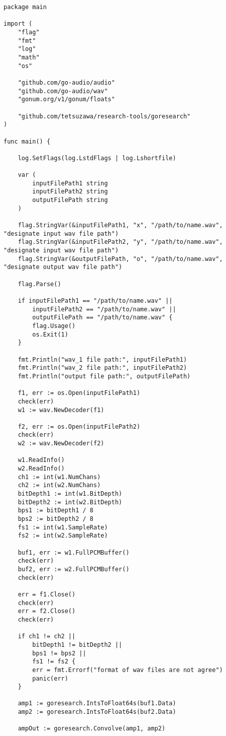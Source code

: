 \begin{lstlisting}[caption=cmd/convolve\_wav/main.go,label=convolve_wav]
package main

import (
	"flag"
	"fmt"
	"log"
	"math"
	"os"

	"github.com/go-audio/audio"
	"github.com/go-audio/wav"
	"gonum.org/v1/gonum/floats"

	"github.com/tetsuzawa/research-tools/goresearch"
)

func main() {

	log.SetFlags(log.LstdFlags | log.Lshortfile)

	var (
		inputFilePath1 string
		inputFilePath2 string
		outputFilePath string
	)

	flag.StringVar(&inputFilePath1, "x", "/path/to/name.wav", "designate input wav file path")
	flag.StringVar(&inputFilePath2, "y", "/path/to/name.wav", "designate input wav file path")
	flag.StringVar(&outputFilePath, "o", "/path/to/name.wav", "designate output wav file path")

	flag.Parse()

	if inputFilePath1 == "/path/to/name.wav" ||
		inputFilePath2 == "/path/to/name.wav" ||
		outputFilePath == "/path/to/name.wav" {
		flag.Usage()
		os.Exit(1)
	}

	fmt.Println("wav_1 file path:", inputFilePath1)
	fmt.Println("wav_2 file path:", inputFilePath2)
	fmt.Println("output file path:", outputFilePath)

	f1, err := os.Open(inputFilePath1)
	check(err)
	w1 := wav.NewDecoder(f1)

	f2, err := os.Open(inputFilePath2)
	check(err)
	w2 := wav.NewDecoder(f2)

	w1.ReadInfo()
	w2.ReadInfo()
	ch1 := int(w1.NumChans)
	ch2 := int(w2.NumChans)
	bitDepth1 := int(w1.BitDepth)
	bitDepth2 := int(w2.BitDepth)
	bps1 := bitDepth1 / 8
	bps2 := bitDepth2 / 8
	fs1 := int(w1.SampleRate)
	fs2 := int(w2.SampleRate)

	buf1, err := w1.FullPCMBuffer()
	check(err)
	buf2, err := w2.FullPCMBuffer()
	check(err)

	err = f1.Close()
	check(err)
	err = f2.Close()
	check(err)

	if ch1 != ch2 ||
		bitDepth1 != bitDepth2 ||
		bps1 != bps2 ||
		fs1 != fs2 {
		err = fmt.Errorf("format of wav files are not agree")
		panic(err)
	}

	amp1 := goresearch.IntsToFloat64s(buf1.Data)
	amp2 := goresearch.IntsToFloat64s(buf2.Data)

	ampOut := goresearch.Convolve(amp1, amp2)


\end{lstlisting}
